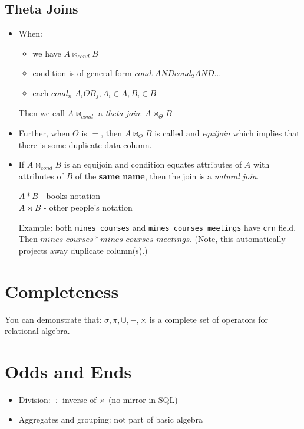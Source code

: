 \documentclass{../cheatsheet}
\begin{document}
\begin{multicols*}{2}
    \subsection{Theta Joins}
    \begin{itemize}
        \item When:
            \begin{itemize}
                \item we have $A \bowtie_{cond} B$
                \item condition is of general form $cond_1 AND cond_2 AND \dots$
                \item each $cond_n$ $A_i \Theta B_j, A_i \in A, B_i \in B$
            \end{itemize}
            Then we call $A \bowtie_{cond}$ a \textit{theta join}: $A
            \bowtie_{\Theta} B$

        \item Further, when $\Theta$ is $=$, then $A \bowtie_\Theta B$ is called
            and \textit{equijoin} which implies that there is some duplicate
            data column.

        \item If $A \bowtie_{cond} B$ is an equijoin and condition equates
            attributes of $A$ with attributes of $B$ of the \textbf{same name},
            then the join is a \textit{natural join}.

            $A * B$ - books notation \\
            $A \bowtie B$ - other people's notation

            Example: both \texttt{mines\_courses} and
            \texttt{mines\_courses\_meetings} have \texttt{crn} field. Then
            $mines\_courses * mines\_courses\_meetings$. (Note, this
            automatically projects away duplicate column(s).)
    \end{itemize}

    \section{Completeness}
    You can demonstrate that: $\sigma, \pi, \cup, -, \times$ is a complete set
    of operators for relational algebra.

    \section{Odds and Ends}
    \begin{itemize}
        \item Division: $\div$ \textapprox inverse of $\times$ (no mirror in
            SQL)
        \item Aggregates and grouping: not part of basic algebra
    \end{itemize}


\end{multicols*}
\end{document}
